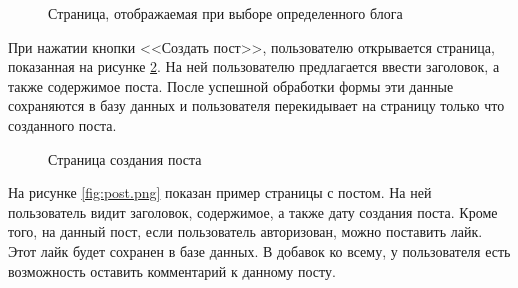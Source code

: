 \documentclass[a4paper, 14pt]{extarticle}
\begin{document}
\begin{figure}[H]
  \centering
  \caption{Страница, отображаемая при выборе определенного блога}
  \label{fig:blog.png}
\end{figure}

При нажатии кнопки <<Создать пост>>, пользователю открывается страница,
показанная на рисунке \ref{fig:create-post.png}. На ней пользователю
предлагается ввести заголовок, а также содержимое поста. После успешной
обработки формы эти данные сохраняются в базу данных и пользователя перекидывает
на страницу только что созданного поста.

\begin{figure}[H]
  \centering
  \caption{Страница создания поста}
  \label{fig:create-post.png}
\end{figure}

На рисунке \ref{fig:post.png} показан пример страницы с постом. На ней
пользователь видит заголовок, содержимое, а также дату создания поста. Кроме
того, на данный пост, если пользователь авторизован, можно поставить лайк. Этот
лайк будет сохранен в базе данных. В добавок ко всему, у пользователя есть
возможность оставить комментарий к данному посту.
\end{document}
